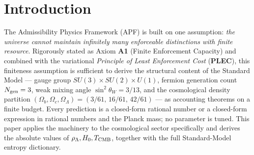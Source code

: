 \documentclass[11pt]{article}
\newcommand{\Aone}{\textbf{A1}}
\newcommand{\PLEC}{\textbf{PLEC}}
\begin{document}
\begin{abstract}
\paragraph{Integrated non-trivial content (Supplement~\S O).}  The paper's non-trivial structural mechanism --- the $I_2$ bridge, its gauge-uniqueness strengthening, its framework-internal forcing chain yielding $(K_{\rm SM}, d_{\rm eff}^{\rm SM}) = (61, 102)$, its structurally-mandatory two-tier architecture, and its brittle cosmological consequences --- is collected in the centerpiece Supplement \S O.  Four strengthened-in-v2.3 mathematical results appear there in compressed form: Theorem 7.14$'$ ($I_2$ algebraic closure: Type III$_1$ factor at infinite volume via Araki--Connes classification); Theorem C.5 (single-scale impossibility: the two-tier architecture is structurally mandatory); Theorem 5.7 ($V_\Lambda$ gauge-uniqueness: the 42-dim bridge subspace is the unique $G_{\rm SM}$-invariant complement of $V_{\rm local}$); and a full-covariance Planck 2018 multivariate Bayes-factor analysis over $(\Omega_b, \Omega_c, \Omega_\Lambda)$ giving $\chi^2 = 1.18$ ($p \approx 0.76$, Mahalanobis distance $1.09\sigma$).  A competitive statistical comparison to $\Lambda$CDM posteriors under full Planck + BAO + SN likelihoods with nuisance parameters is explicitly deferred to a companion phenomenology paper.  Section~9's operator realisation is finite-dimensional, with an infinite-volume extension available via the Bratteli--Robinson inductive limit (Supplement \S H.5.2, Theorem 7.14$'$); no algebraic-QSM content beyond standard machinery is claimed.
\end{abstract}

\bigskip

\section{Introduction}\label{sec:intro}

The Admissibility Physics Framework (APF) is built on one assumption: \emph{the universe cannot maintain infinitely many enforceable distinctions with finite resource}. Rigorously stated as Axiom \Aone{} (Finite Enforcement Capacity) and combined with the variational \emph{Principle of Least Enforcement Cost} (\PLEC), this finiteness assumption is sufficient to derive the structural content of the Standard Model --- gauge group $SU(3)\times SU(2)\times U(1)$, fermion generation count $N_{\rm gen}=3$, weak mixing angle $\sin^2\theta_W = 3/13$, and the cosmological density partition $(\Omega_b, \Omega_c, \Omega_\Lambda) = (3/61,\,16/61,\,42/61)$ --- as accounting theorems on a finite budget. Every prediction is a closed-form rational number or a closed-form expression in rational numbers and the Planck mass; no parameter is tuned. This paper applies the machinery to the cosmological sector specifically and derives the absolute values of $\rho_\Lambda, H_0, T_{\rm CMB}$, together with the full Standard-Model entropy dictionary.
\end{document}
